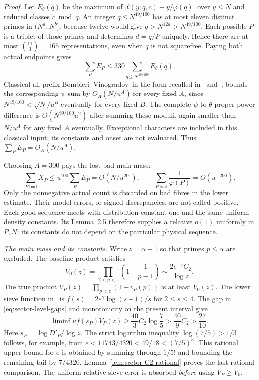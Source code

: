 \documentclass[11pt,a4paper]{article}
\theoremstyle{definition}
\theoremstyle{remark}
\begin{document}
\begin{proof}
Let $E_\theta(q)$ be the maximum of
$|\theta(y;q,c)-y/\varphi(q)|$ over $y\leq N$ and reduced
classes $c\bmod q$.  An integer $q\leq N^{49/100}$ has at most
eleven distinct primes in $(N^a,N^b]$, because twelve would give
$q>N^{12a}>N^{49/100}$.  Each possible $P$ is a triplet of those
primes and determines $d=q/P$ uniquely.  Hence there are at most
$\binom{11}{3}=165$ representations, even when $q$ is not squarefree.
Paying both actual endpoints gives
\begin{equation}
       \sum_PE_P\leq330\sum_{q\leq N^{49/100}}E_\theta(q).
 \label{eq:sector-joint-BV}
\end{equation}
Classical all-prefix Bombieri--Vinogradov, in the form recalled
in~\cite{AH} and~\cite[(6.24)]{Richert}, bounds the corresponding
$\psi$ sum by $O_A(N/u^A)$ for every fixed $A$, since
$N^{49/100}<\sqrt N/u^B$ eventually for every fixed $B$.
The complete $\psi$-to-$\theta$ proper-power difference is
$O(N^{99/100}u^2)$ after summing these moduli, again smaller than
$N/u^A$ for any fixed $A$ eventually.  Exceptional characters are
included in this classical input; its constants and onset are not
evaluated.  Thus $\sum_PE_P=O_A(N/u^A)$.

Choosing $A=300$ pays the lost bad main mass:
\begin{equation}
 \sum_{P\ \mathrm{bad}}X_P
       \leq u^{100}\sum_PE_P=O(N/u^{200}),\qquad
 \sum_{P\ \mathrm{bad}}\frac1{\varphi(P)}=O(u^{-200}).
 \label{eq:sector-bad-mass}
\end{equation}
Only the nonnegative actual count is discarded on bad fibres in
the lower estimate.  Their model errors, or signed discrepancies,
are not called positive.  Each good sequence meets
\cite[Definition 2.4]{MTZ} with distribution constant one and the
same uniform density constants.  Its Lemma~2.5 therefore supplies
a relative $o(1)$ uniformly in $P,N$; its constants do not depend
on the particular physical sequence.

\emph{The main mass and its constants.}
Write $z=\alpha+1$ so that primes $p\leq\alpha$ are excluded.
The baseline product satisfies
\[
 V_0(z)=\prod_{2<p<z}\left(1-\frac1{p-1}\right)
                \sim\frac{2e^{-\gamma}C_2}{\log z}.
\]
The true product $V_P(z)=\prod_{p<z}(1-v_P(p))$ is at least
$V_0(z)$.  The lower sieve function in~\cite[(2.4)--(2.5)]{MTZ}
is $f(s)=2e^\gamma\log(s-1)/s$ for $2\leq s\leq4$.
The gap in \eqref{eq:sector-level-gaps} and monotonicity on the
present interval give
\begin{equation}
 \liminf u f(s_P)V_P(z)
    \geq\frac{40}{3}C_2\log\frac75
    >\frac{40}{9}C_2>\frac{27}{10}.
 \label{eq:sector-fV}
\end{equation}
Here $s_P=\log D'_P/\log z$.  The strict logarithm inequality
$\log(7/5)>1/3$ follows, for example, from
$e<11743/4320<49/18<(7/5)^3$.  This rational upper bound for $e$
is obtained by summing through $1/5!$ and bounding the remaining
tail by $7/4320$.  Lemma~\ref{lem:sector-C2-rational} proves the
last rational comparison.  The uniform relative sieve error is
absorbed \emph{before} using $V_P\geq V_0$.


\end{proof}
\end{document}
